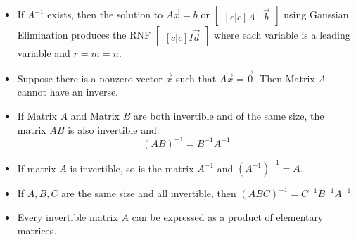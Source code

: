 \documentclass{article}
\begin{document}
\begin{itemize}
    \item If $A^{-1}$ exists, then the solution to $A\vec{x}=b$ or $\begin{bmatrix}[c|c]
        A & \vec{b}
    \end{bmatrix}$ using Gaussian Elimination produces the RNF $\begin{bmatrix}[c|c]
        I \vec{d}
    \end{bmatrix}$ where each variable is a leading variable and $r=m=n$.
    \item Suppose there is a nonzero vector $\vec{x}$ such that $A\vec{x}=\vec{0}$. Then Matrix $A$ cannot have an inverse.
    \item If Matrix $A$ and Matrix $B$ are both invertible and of the same size, the matrix $AB$ is also invertible and:
    \begin{equation}
        (AB)^{-1} = B^{-1}A^{-1}
        \label{eq:}
    \end{equation}
    \item If matrix $A$ is invertible, so is the matrix $A^{-1}$ and $\left(A^{-1}\right)^{-1}=A$.
    \item If $A,B,C$ are the same size and all invertible, then $(ABC)^{-1}=C^{-1}B^{-1}A^{-1}$ 
    \item Every invertible matrix $A$ can be expressed as a product of elementary matrices.
\end{itemize}
\end{document}
